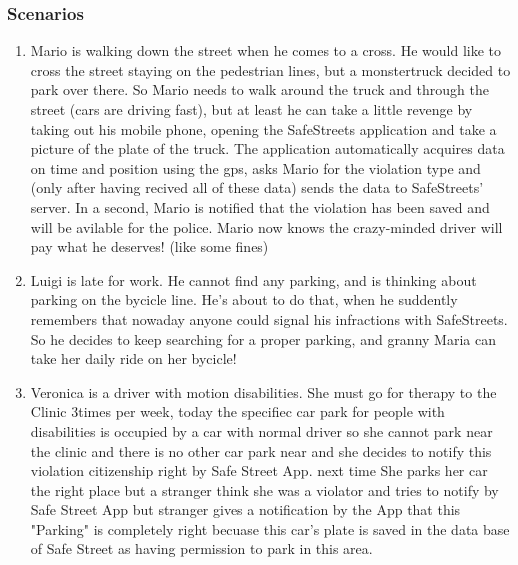 \documentclass{article}
\newcommand{\enum}[1]{\texttt{#1.\arabic*}}
\begin{document}
		\subsubsection{Scenarios}
		
			\begin{enumerate}[label=\enum{S}]
				\item \label{S:The man, the street and the monstertruck}
				Mario is walking down the street when he comes to a cross. He would like to cross the street staying on the pedestrian lines, but a monstertruck decided to park over there. So Mario needs to walk around the truck and through the street (cars are driving fast), but at least he can take a little revenge by taking out his mobile phone, opening the SafeStreets application and take a picture of the plate of the truck. The application automatically acquires data on time and position using the gps, asks Mario for the violation type and (only after having recived all of these data) sends the data to SafeStreets' server. In a second, Mario is notified that the violation has been saved and will be avilable for the police.
Mario now knows the crazy-minded driver will pay what he deserves! (like some fines)
		\item \label{S:Prevent is better than healing}Luigi is late for work. He cannot find any parking, and is thinking about parking on the bycicle line. He's about to do that, when he suddently remembers that nowaday anyone could signal his infractions with SafeStreets. So he decides to keep searching for a proper parking, and granny Maria can take her daily ride on her bycicle!
					
		\item\label{S:disabilities}Veronica is a driver with motion disabilities. She must go for therapy to the Clinic 3times per week, today the specifiec car park for people with disabilities is occupied by a car with normal driver so she cannot park near the clinic and there is no other car park near and she decides to notify this violation citizenship right by Safe Street App. next time She parks her car the right place but a stranger think she was a violator and tries to notify by Safe Street App but stranger gives a notification by the App that this "Parking" is completely right becuase this car's plate is saved in the data base of Safe Street as having permission to park in this area.


\end{enumerate}
\end{document}
